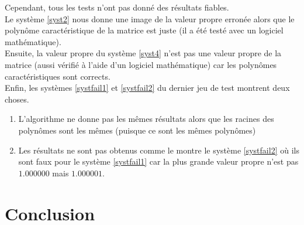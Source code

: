 \documentclass{report}
\begin{document}
    Cependant, tous les tests n'ont pas donné des résultats fiables. \\
    
    Le système \eqref{syst2} nous donne une image de la valeur propre erronée alors que le polynôme caractéristique de la matrice est juste (il a été testé avec un logiciel mathématique). \\
    Ensuite, la valeur propre du système \eqref{syst4} n'est pas une valeur propre de la matrice (aussi vérifié à l'aide d'un logiciel mathématique) car les polynômes caractéristiques sont corrects. \\
    Enfin, les systèmes \eqref{systfail1} et \eqref{systfail2} du dernier jeu de test montrent deux choses.
    \begin{enumerate}
    \item{L'algorithme ne donne pas les mêmes résultats alors que les racines des polynômes sont les mêmes (puisque ce sont les mêmes polynômes)}
    \item{Les résultats ne sont pas obtenus comme le montre le système \eqref{systfail2} où ils sont faux pour le système \eqref{systfail1} car la plus grande valeur propre n'est pas $1.000000$ mais $1.000001$.}
    \end{enumerate}
  \chapter{Conclusion}
\end{document}
